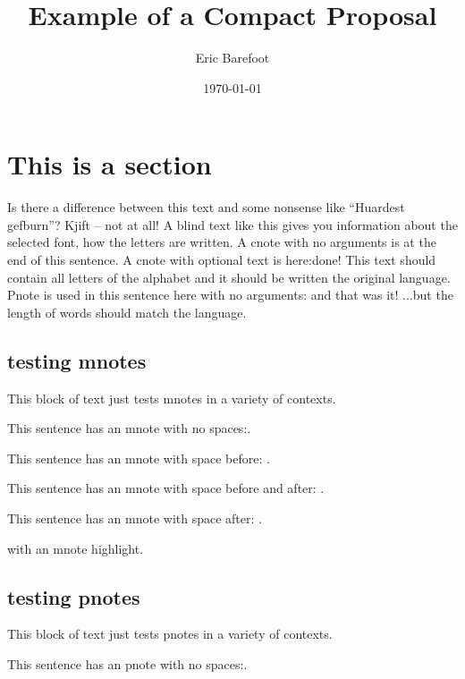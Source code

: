 \documentclass[final]{compact_proposal}
\title{Example of a Compact Proposal}
\author{Eric Barefoot}
\date{\today}
\begin{document}
\maketitle

\section{This is a section}
Is there a difference between this text and some nonsense like ``Huardest gefburn''? Kjift – not at all!
A blind text like this gives you information about the  selected font, how the letters are written. A cnote with no arguments is at the end of this sentence\cnote.
A cnote with optional text is here: done!
This text should contain all letters of the alphabet and it should be written  the original language.
Pnote is used in this sentence here with no arguments: \pnote and that was it! ...but the length of words  should match the language.

\subsection{testing mnotes}

This block of text just tests mnotes in a variety of contexts.

This sentence has an mnote with no spaces:.

This sentence has an mnote with space before: .

This sentence has an mnote with space before and after:  .

This sentence has an mnote with space after: .

 with an mnote highlight.

\subsection{testing pnotes}

This block of text just tests pnotes in a variety of contexts.

This sentence has an pnote with no spaces:.
\end{document}
